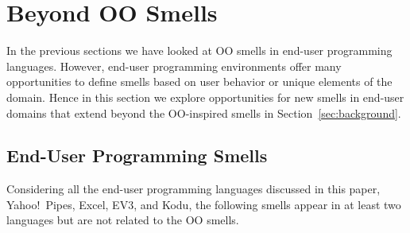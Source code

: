 \documentclass[conference]{IEEEtran}
\begin{document}


\section{Beyond OO Smells}
\label{sec:beyond}

\label{sec:background:domain}
In the previous sections we have looked at OO smells in end-user programming languages. However, end-user programming environments offer many opportunities to define smells based on user behavior or unique elements of the domain. Hence in this section we explore opportunities for new smells in end-user domains that extend beyond the OO-inspired smells in Section~\ref{sec:background}. 

\subsection{End-User Programming Smells}
\label{sec:eupsmells}
Considering all the end-user programming languages discussed in this paper, Yahoo!\ Pipes, Excel, EV3, and Kodu, the following smells appear in at least two   languages but are not related to the OO smells. 
\end{document}
